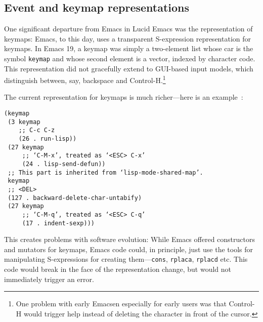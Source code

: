 \documentclass[format=acmsmall, review=false, screen=true]{acmart}
\begin{document}
\subsection{Event and keymap representations}

One significant departure from Emacs in Lucid Emacs was the
representation of keymaps: Emacs, to this day, uses a transparent
S-expression representation for keymaps.
In Emacs 19, a keymap was
simply a two-element list whose car is the symbol \texttt{keymap} and
whose second element is a vector, indexed by character code.
This
representation did not gracefully extend to GUI-based input models,
which distinguish between, say, backspace and Control-H.\footnote{One
  problem with early Emacsen especially for early users was that
  Control-H would trigger help instead of deleting the character in
  front of the cursor.}

The current representation for keymaps is much richer---here is an
example~\cite{ELispManual2018}:
%
\begin{verbatim}
(keymap
 (3 keymap
    ;; C-c C-z
    (26 . run-lisp))
 (27 keymap
     ;; ‘C-M-x’, treated as ‘<ESC> C-x’
     (24 . lisp-send-defun))
 ;; This part is inherited from ‘lisp-mode-shared-map’.
 keymap
 ;; <DEL>
 (127 . backward-delete-char-untabify)
 (27 keymap
     ;; ‘C-M-q’, treated as ‘<ESC> C-q’
     (17 . indent-sexp)))
\end{verbatim}
%
This creates problems with software evolution: While Emacs offered
constructors and mutators for keymaps, Emacs code could, in principle,
just use the tools for manipulating S-expressions for creating
them---\texttt{cons}, \texttt{rplaca}, \texttt{rplacd} etc.  This code
would break in the face of the representation change, but would not
immediately trigger an error.
\end{document}
